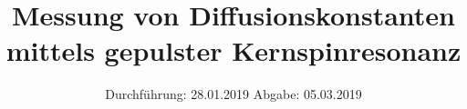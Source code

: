 

\subject{V 49}
\title{Messung von Diffusionskonstanten mittels
gepulster Kernspinresonanz}
\date{
  Durchführung: 28.01.2019
  \hspace{3em}
  Abgabe: 05.03.2019
}



\maketitle
\thispagestyle{empty}
\tableofcontents
\newpage
\setcounter{page}{1}





\printbibliography


